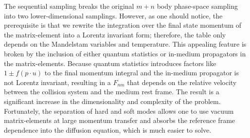 The sequential sampling breaks the original $m+n$ body phase-space sampling into two lower-dimensional samplings.
However, as one should notice, the prerequisite is that we rewrite the integration over the final state momentum of the matrix-element into a Lorentz invariant form; therefore, the table only depends on the Mandelstam variables and temperature.
This appealing feature is broken by the inclusion of either
quantum statistics or in-medium propagators in the matrix-elements. 
Because quantum statistics introduces factors like $1\pm f(p\cdot u)$ to the final momentum integral and the in-medium propagator is not Lorentz invariant, resulting in a $F_{nm}$ that depends on the relative velocity between the collision system and the medium rest frame.
The result is a significant increase in the dimensionality and complexity of the problem. 
Fortunately, the separation of hard and soft modes allows one to use vacuum matrix-elements at large momentum transfer and absorbs the reference frame dependence into the diffusion equation, which is much easier to solve.

